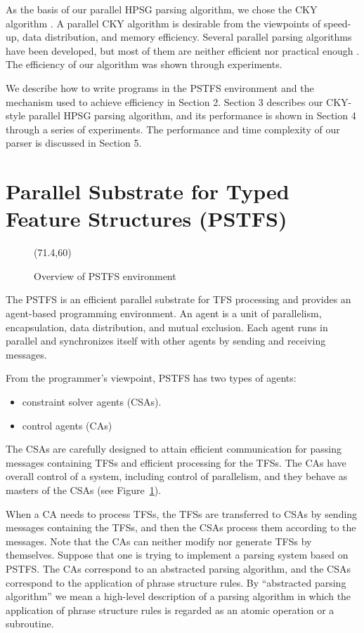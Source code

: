   As the basis of our parallel HPSG parsing algorithm, we chose the
CKY algorithm \cite{Kasami65,Younger67}.  A parallel CKY algorithm is
desirable from the viewpoints of speed-up, data distribution, and
memory efficiency.  Several parallel parsing algorithms have been
developed, but most of them are neither efficient
nor practical enough \cite{PNLP94,Nijholt,Grishman88,Thompson}.  The
efficiency of our algorithm was shown through experiments.

  We describe how to write programs in the PSTFS environment and the
mechanism used to achieve efficiency in Section 2.  Section 3
describes our CKY-style parallel HPSG parsing algorithm, and its
performance is shown in Section 4 through a series of experiments.
The performance and time complexity of our parser is discussed in
Section 5.

\section{Parallel Substrate for Typed Feature Structures (PSTFS)}
\begin{figure}[t]
\begin{center}
\atari(71.4,60)
\caption{Overview of PSTFS environment}
\label{fig:overview}
\end{center}
\end{figure}

  The PSTFS is an efficient parallel substrate for TFS processing and
provides an agent-based programming environment.  An agent is a unit
of parallelism, encapsulation, data distribution, and mutual
exclusion.  Each agent runs in parallel and synchronizes itself with
other agents by sending and receiving messages.

  From the programmer's viewpoint, PSTFS has two types of agents:

\begin{itemize}
\setlength{\itemsep}{0.5pt plus0.5pt minus0.5pt}
\item constraint solver agents (CSAs).
\item control agents (CAs)
\end{itemize}

  The CSAs are carefully designed to attain efficient communication
for passing messages containing TFSs and efficient processing for the
TFSs.  The CAs have overall control of a system, including control of
parallelism, and they behave as masters of the CSAs (see
Figure~\ref{fig:overview}).

  When a CA needs to process TFSs, the TFSs are transferred to CSAs by
sending messages containing the TFSs, and then the CSAs process them
according to the messages. Note that the CAs can neither modify nor
generate TFSs by themselves.  Suppose that one is trying to implement
a parsing system based on PSTFS.  The CAs correspond to an abstracted
parsing algorithm, and the CSAs correspond to the application of
phrase structure rules.  By ``abstracted parsing algorithm'' we mean a
high-level description of a parsing algorithm in which the application
of phrase structure rules is regarded as an atomic operation or a
subroutine.

